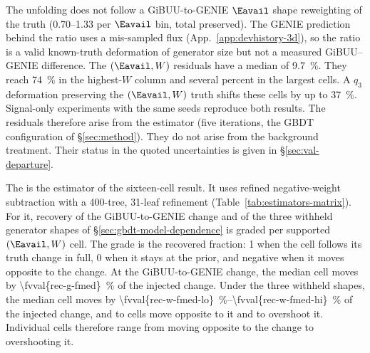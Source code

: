 The unfolding does not follow a GiBUU-to-GENIE $\Eavail$ shape reweighting of the truth (0.70--1.33 per $\Eavail$ bin, total preserved). The GENIE prediction behind the ratio uses a mis-sampled flux (App.~\ref{app:devhistory-3d}), so the ratio is a valid known-truth deformation of generator size but not a measured GiBUU--GENIE difference. The $(\Eavail,W)$ residuals have a median of \SI{9.7}{\percent}. They reach \SI{74}{\percent} in the highest-$W$ column and several percent in the largest cells. A $q_3$ deformation preserving the $(\Eavail,W)$ truth shifts these cells by up to \SI{37}{\percent}. Signal-only experiments with the same seeds reproduce both results. The residuals therefore arise from the estimator (five iterations, the GBDT configuration of \S\ref{sec:method}). They do not arise from the background treatment. Their status in the quoted uncertainties is given in \S\ref{sec:val-departure}.

The \estMultiD{} is the estimator of the sixteen-cell result. It uses refined negative-weight subtraction with a 400-tree, 31-leaf refinement (Table~\ref{tab:estimators-matrix}). For it, recovery of the GiBUU-to-GENIE change and of the three withheld generator shapes of \S\ref{sec:gbdt-model-dependence} is graded per supported $(\Eavail,W)$ cell. The grade is the recovered fraction: 1 when the cell follows its truth change in full, 0 when it stays at the prior, and negative when it moves opposite to the change. At the GiBUU-to-GENIE change, the median cell moves by \SI{\fvval{rec-g-fmed}}{\percent} of the injected change. Under the three withheld shapes, the median cell moves by \SIrange{\fvval{rec-w-fmed-lo}}{\fvval{rec-w-fmed-hi}}{\percent} of the injected change, and  to  cells move opposite to it and  to  overshoot it. Individual cells therefore range from moving opposite to the change to overshooting it.

